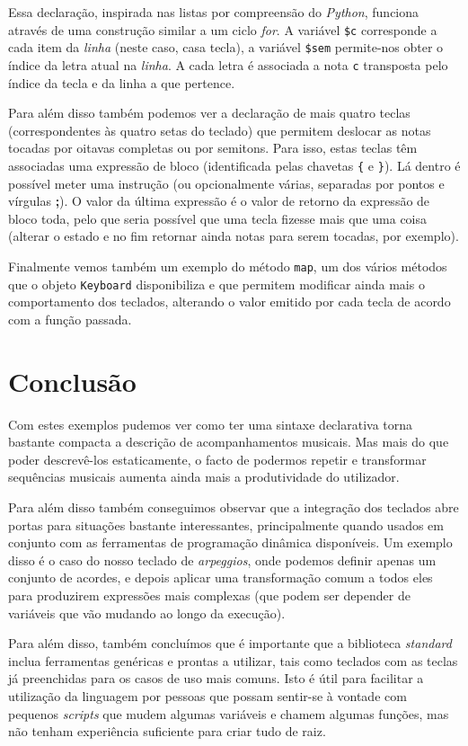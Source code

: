 Essa declaração, inspirada nas listas por compreensão do \textit{Python}, funciona através de uma construção similar a um ciclo \textit{for}. A variável \texttt{\$c} corresponde a cada item da \textit{linha} (neste caso, casa tecla), a variável \texttt{\$sem} permite-nos obter o índice da letra atual na \textit{linha}. A cada letra é associada a nota \texttt{c} transposta pelo índice da tecla e da linha a que pertence.

Para além disso também podemos ver a declaração de mais quatro teclas (correspondentes às quatro setas do teclado) que permitem deslocar as notas tocadas por oitavas completas ou por semitons. Para isso, estas teclas têm associadas uma expressão de bloco (identificada pelas chavetas \texttt{\{} e \texttt{\}}). Lá dentro é possível meter uma instrução (ou opcionalmente várias, separadas por pontos e vírgulas \textbf{;}). O valor da última expressão é o valor de retorno da expressão de bloco toda, pelo que seria possível que uma tecla fizesse mais que uma coisa (alterar o estado e no fim retornar ainda notas para serem tocadas, por exemplo).

Finalmente vemos também um exemplo do método \texttt{map}, um dos vários métodos que o objeto \texttt{Keyboard} disponibiliza e que permitem modificar ainda mais o comportamento dos teclados, alterando o valor emitido por cada tecla de acordo com a função passada.

\needspace{.2\textheight}

\section{Conclusão}
Com estes exemplos pudemos ver como ter uma sintaxe declarativa torna bastante compacta a descrição de acompanhamentos musicais. Mas mais do que poder descrevê-los estaticamente, o facto de podermos repetir e transformar sequências musicais aumenta ainda mais a produtividade do utilizador.

Para além disso também conseguimos observar que a integração dos teclados abre portas para situações bastante interessantes, principalmente quando usados em conjunto com as ferramentas de programação dinâmica disponíveis. Um exemplo disso é o caso do nosso teclado de \textit{arpeggios}, onde podemos definir apenas um conjunto de acordes, e depois aplicar uma transformação comum a todos eles para produzirem expressões mais complexas (que podem ser depender de variáveis que vão mudando ao longo da execução).

Para além disso, também concluímos que é importante que a biblioteca \textit{standard} inclua ferramentas genéricas e prontas a utilizar, tais como teclados com as teclas já preenchidas para os casos de uso mais comuns. Isto é útil para facilitar a utilização da linguagem por pessoas que possam sentir-se à vontade com pequenos \textit{scripts} que mudem algumas variáveis e chamem algumas funções, mas não tenham experiência suficiente para criar tudo de raiz.

